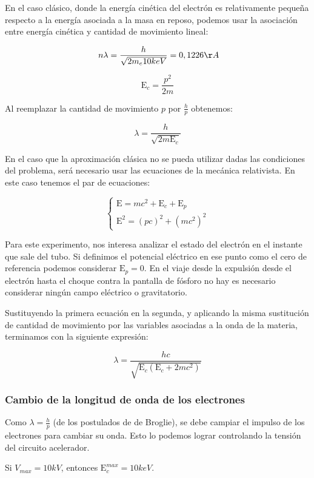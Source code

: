 \documentclass[]{article}
\begin{document}
En el caso clásico, donde la energía cinética del electrón es
relativamente pequeña respecto a la energía asociada a la masa en
reposo, podemos usar la asociación entre energía cinética y cantidad de
movimiento lineal:

\[\ n \lambda = \frac{h}{\sqrt{2m_e 10keV}} = 0,1226 \AA\]

\[\mathrm{E}_c = \frac{p^2}{2m}\]

Al reemplazar la cantidad de movimiento \(p\) por \(\frac{h}{p}\)
obtenemos:

\[ \lambda = \frac{h}{\sqrt{2m\mathrm{E}_c}} \]

En el caso que la aproximación clásica no se pueda utilizar dadas las
condiciones del problema, será necesario usar las ecuaciones de la
mecánica relativista. En este caso tenemos el par de ecuaciones:

\[
\left\{\begin{matrix}
    \mathrm{E} = mc^2 + \mathrm{E}_c + \mathrm{E}_p\\
    \mathrm{E}^2 = (pc)^2 + (mc^2)^2
\end{matrix}\right.
\]

Para este experimento, nos interesa analizar el estado del electrón en
el instante que sale del tubo. Si definimos el potencial eléctrico en
ese punto como el cero de referencia podemos considerar
\(\mathrm{E}_p = 0\). En el viaje desde la expulsión desde el electrón
hasta el choque contra la pantalla de fósforo no hay es necesario
considerar ningún campo eléctrico o gravitatorio.

Sustituyendo la primera ecuación en la segunda, y aplicando la misma
sustitución de cantidad de movimiento por las variables asociadas a la
onda de la materia, terminamos con la siguiente expresión:

\[\lambda = \frac{hc}{\sqrt{\mathrm{E}_c(\mathrm{E}_c + 2mc^2)}}\]

\hypertarget{cambio-de-la-longitud-de-onda-de-los-electrones}{%
\subsubsection{Cambio de la longitud de onda de los
electrones}\label{cambio-de-la-longitud-de-onda-de-los-electrones}}

Como \(\lambda = \frac{h}{p}\) (de los postulados de de Broglie), se
debe campiar el impulso de los electrones para cambiar su onda. Esto lo
podemos lograr controlando la tensión del circuito acelerador.

Si \(V_{max} = 10 kV\), entonces \(\mathrm{E}_c^{max} = 10 keV\).
\end{document}
